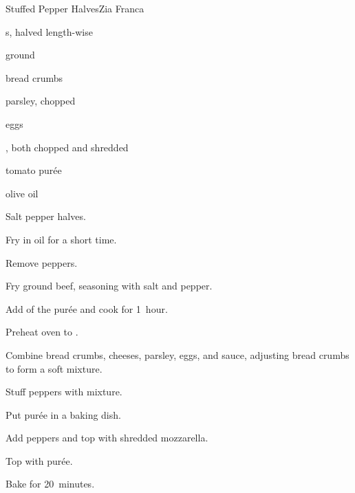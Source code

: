 \begin{recipe}{Stuffed Pepper Halves}{Zia Franca}{}

\begin{ingredients}
\item {}s, halved length-wise
\item ground 
\item bread crumbs
\item {}
\item parsley, chopped
\item eggs
\item {}, both chopped and shredded
\item tomato pur\'ee
\item olive oil
\end{ingredients}

\begin{directions}
\item Salt pepper halves.
\item Fry in oil for a short time.
\item Remove peppers.
\item Fry ground beef, seasoning with salt and pepper.
\item Add \half{} of the pur\'ee and cook for 1~hour.
\item Preheat oven to .
\item Combine bread crumbs, cheeses, parsley, eggs, and sauce, adjusting bread crumbs to form a soft mixture.
\item Stuff peppers with mixture.
\item Put pur\'ee in a baking dish.
\item Add peppers and top with shredded mozzarella.
\item Top with pur\'ee.
\item Bake for 20~minutes.
\end{directions}

\end{recipe}

